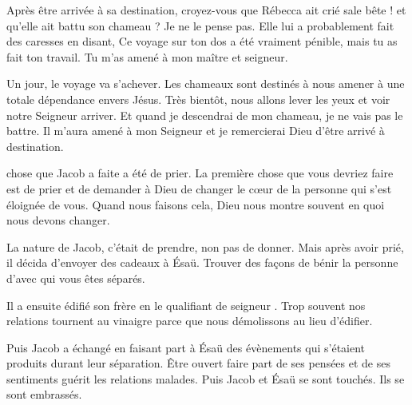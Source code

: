 Après être arrivée à sa destination,
 croyez-vous que Rébecca ait crié \og sale bête ! \fg{}
 et qu'elle ait battu son chameau ? Je ne le pense pas.
 Elle lui a probablement fait des caresses en disant,
 \og Ce voyage sur ton dos a été vraiment pénible,
 mais tu as fait ton travail. Tu m'as amené à mon maître et seigneur. \fg{}


Un jour, le voyage va s'achever. Les chameaux sont destinés à nous amener
 à une totale dépendance envers Jésus.
 Très bientôt, nous allons lever les yeux et voir notre Seigneur arriver.
 Et quand je descendrai de mon chameau, je ne vais pas le battre.
 Il m'aura amené à mon Seigneur et je remercierai Dieu
 d'être arrivé à destination. 

\dvrule







 chose que Jacob a faite a été de prier.
 La première chose que vous devriez faire est de prier et de demander
 à Dieu de changer le cœur de la personne qui s'est éloignée de vous.
 Quand nous faisons cela, Dieu nous montre souvent en quoi nous devons changer.

La nature de Jacob, c'était de prendre, non pas de donner.
 Mais après avoir prié, il décida d'envoyer des cadeaux à Ésaü.
 Trouver des façons de bénir la personne d'avec qui vous êtes séparés. 

Il a ensuite édifié son frère en le qualifiant de \og seigneur \fg{}.
 Trop souvent nos relations tournent au vinaigre parce que nous démolissons
 au lieu d'édifier. 

Puis Jacob a échangé en faisant part à Ésaü des évènements
 qui s'étaient produits durant leur séparation.
 Être ouvert \ocadr{}faire part de ses pensées et de ses sentiments\fcadr{}
 guérit les relations malades.
 Puis Jacob et Ésaü se sont touchés. Ils se sont embrassés. 

